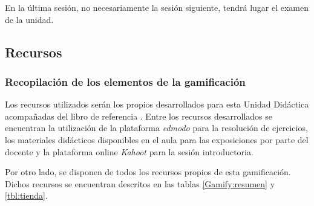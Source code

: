 \label{ResumenSesion9}
%
En la última sesión, no necesariamente la sesión siguiente, tendrá lugar el examen de la unidad.



\subsection{Recursos}

\subsubsection{Recopilación de los elementos de la gamificación }

Los recursos utilizados serán los propios desarrollados para esta Unidad Didáctica acompañadas del libro de referencia \cite{MareaVerde}.
%
Entre los recursos desarrollados se encuentran la utilización de la plataforma \textit{edmodo} para la resolución de ejercicios, los materiales didácticos disponibles en el aula para las exposiciones por parte del docente y la plataforma online \textit{Kahoot} para la sesión introductoria.

Por otro lado, se disponen de todos los recursos propios de esta gamificación.
%
Dichos recursos se encuentran descritos en las tablas \ref{Gamify:resumen} y \ref{tbl:tienda}.




